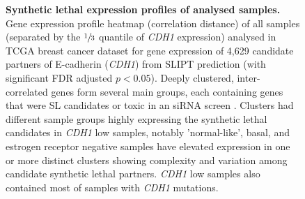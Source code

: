\begin{figure}[!ht]
\begin{mdframed}
  \centering
    \caption[Synthetic lethal expression profiles of analysed samples]{\small \textbf{Synthetic lethal expression profiles of analysed samples.} Gene expression profile heatmap (correlation distance) of all samples (separated by the $\sfrac{1}{3}$ quantile of \textit{CDH1} expression) analysed in TCGA breast cancer dataset for gene expression of 4,629 candidate partners of E-cadherin (\textit{CDH1}) from SLIPT prediction (with significant FDR adjusted $p < 0.05$). Deeply clustered, inter-correlated genes form several main groups, each containing genes that were SL candidates or toxic in an siRNA screen \cite{Telford2015}. Clusters had different sample groups highly expressing the synthetic lethal candidates in \textit{CDH1} low samples, notably 'normal-like', basal, and estrogen receptor negative samples have elevated expression in one or more distinct clusters showing complexity and variation among candidate synthetic lethal partners. \textit{CDH1} low samples also contained most of samples with \textit{CDH1} mutations.
}
\label{fig:slipt_expr_mtSL}
\end{mdframed}
\end{figure}


